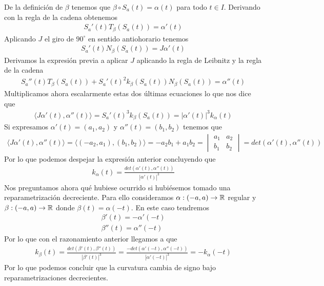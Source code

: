 \begin{ejercicio}
    De la definición de $\beta$ tenemos que $\beta \circ S_a(t) = \alpha(t)$ para todo $t\in I$. Derivando con la regla de la cadena obtenemos
    \begin{gather*}
        S_a'(t)T_\beta(S_a(t)) = \alpha'(t)
    \end{gather*}
    Aplicando $J$ el giro de $90^\circ$ en sentido antiohorario tenemos
    \begin{gather*}
        S_a'(t)N_\beta(S_a(t)) = J\alpha'(t)
    \end{gather*}
    Derivamos la expresión previa a aplicar $J$ aplicando la regla de Leibnitz y la regla de la cadena
    \begin{gather*}
        S_a''(t)T_\beta(S_a(t)) + S_a'(t)^2k_\beta(S_a(t))N_\beta(S_a(t)) = \alpha''(t)
    \end{gather*}
    Multiplicamos ahora escalarmente estas dos últimas ecuaciones lo que nos dice que 
    \begin{gather*}
        \langle J\alpha'(t), \alpha''(t)\rangle = S_a'(t)^3 k_\beta(S_a(t)) = |\alpha'(t)|^3 k_\alpha(t)
    \end{gather*}
    Si expresamos $\alpha'(t)=(a_1, a_2)$ y $\alpha''(t)=(b_1, b_2)$ tenemos que 
    \begin{gather*}
        \langle J\alpha'(t), \alpha''(t)\rangle = \langle (-a_2, a_1), (b_1, b_2) \rangle = -a_2b_1 + a_1b_2 = 
        \begin{vmatrix}
            a_1 & a_2 \\ b_1 & b_2
        \end{vmatrix} = det(\alpha'(t), \alpha''(t))
    \end{gather*}
    Por lo que podemos despejar la expresión anterior concluyendo que 
    \begin{gather*}
        k_\alpha(t) = \frac{det(\alpha'(t), \alpha''(t))}{|\alpha'(t)|^3}
    \end{gather*}
    Nos preguntamos ahora qué hubiese ocurrido si hubiésemos tomado una reparametrización decreciente. Para ello consideramos $\alpha:(-a,a) \to \mathbb{R}$ regular y $\beta:(-a,a) \to \mathbb{R}$ donde $\beta(t)=\alpha(-t)$. En este caso tendremos
    \begin{gather*}
        \beta'(t) = -\alpha'(-t)\\
        \beta''(t) = \alpha''(-t)
    \end{gather*}
    Por lo que con el razonamiento anterior llegamos a que 
    \begin{gather*}
        k_\beta(t) = \frac{det(\beta'(t), \beta''(t))}{|\beta'(t)|^3} = \frac{-det(\alpha'(-t), \alpha''(-t))}{|\alpha'(-t)|^3} = -k_\alpha(-t)
    \end{gather*}
    Por lo que podemos concluir que la curvatura cambia de signo bajo reparametrizaciones decrecientes.
\end{ejercicio}

